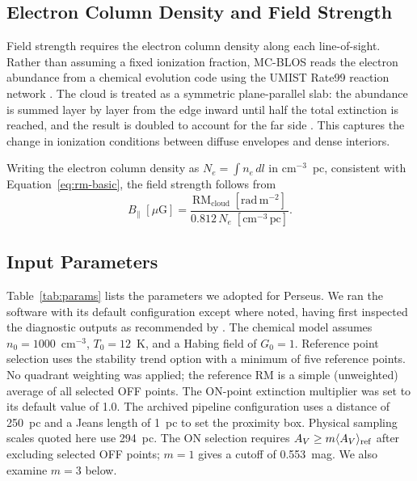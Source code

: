 \documentclass[twocolumn]{aastex701}
\begin{document}
  \subsection{Electron Column Density and Field Strength}
  \label{sec:ne}

  Field strength requires the electron column density along each line-of-sight.
  Rather than assuming a fixed ionization fraction, MC-BLOS reads the electron
  abundance from a chemical evolution code \citep{gibson2009} using the UMIST
  Rate99 reaction network \citep{leteuff2000}. The cloud is treated as a
  symmetric plane-parallel slab: the abundance is summed layer by layer from the
  edge inward until half the total extinction is reached, and the result is
  doubled to account for the far side \citep[see Figure~1
  of][]{tahani2025mcblos}. This captures the change in ionization conditions
  between diffuse envelopes and dense interiors.

  Writing the electron column density as $N_e = \int n_e \, dl$ in
  cm$^{-3}$~pc, consistent with Equation~\ref{eq:rm-basic}, the field strength
  follows from
  \begin{equation}
  \label{eq:blos}
      B_\parallel \;[\mu\mathrm{G}] =
      \frac{\mathrm{RM_{cloud}} \;[\mathrm{rad\,m^{-2}}]}
           {0.812 \, N_e \;[\mathrm{cm^{-3}\,pc}]}.
  \end{equation}

  \subsection{Input Parameters}

  Table~\ref{tab:params} lists the parameters we adopted for Perseus. We ran the
  software with its default configuration except where noted, having first
  inspected the diagnostic outputs as recommended by \citet{tahani2025mcblos}. The chemical
  model assumes $n_0 = 1000$~cm$^{-3}$, $T_0 = 12$~K, and a Habing field of
  $G_0 = 1$. Reference point selection uses the stability trend option with a
  minimum of five reference points. No quadrant weighting was applied; the
  reference RM is a simple (unweighted) average of all selected OFF points. The
  ON-point extinction multiplier was set to its default value of 1.0.
  The archived pipeline configuration uses a distance of 250~pc and a Jeans
  length of 1~pc to set the proximity box. Physical sampling scales quoted
  here use 294~pc. The ON selection requires
  $A_V\geq m\langle A_V\rangle_{\rm ref}$ after excluding selected OFF points;
  $m=1$ gives a cutoff of 0.553~mag. We also examine $m=3$ below.
\end{document}
